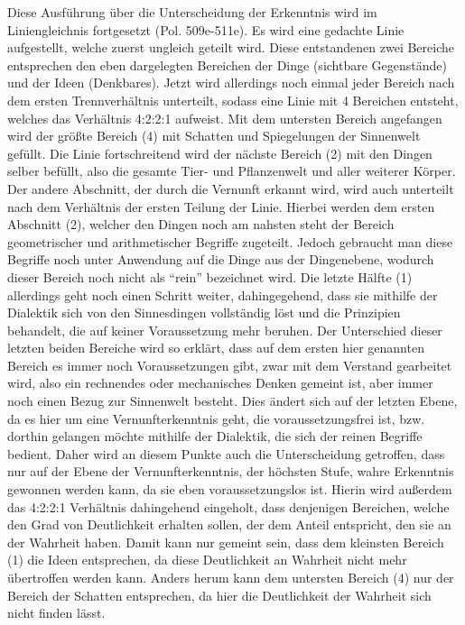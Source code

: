 Diese Ausführung über die Unterscheidung der Erkenntnis wird im Liniengleichnis fortgesetzt (Pol. 509e-511e).
Es wird eine gedachte Linie aufgestellt, welche zuerst ungleich geteilt wird. Diese entstandenen zwei Bereiche entsprechen den eben dargelegten Bereichen der Dinge (sichtbare Gegenstände) und der Ideen (Denkbares). Jetzt wird allerdings noch einmal jeder Bereich nach dem ersten Trennverhältnis unterteilt, sodass eine Linie mit 4 Bereichen entsteht, welches das Verhältnis 4:2:2:1 aufweist. Mit dem untersten Bereich angefangen wird der größte Bereich (4) mit Schatten und Spiegelungen der Sinnenwelt gefüllt. Die Linie fortschreitend wird der nächste Bereich (2) mit den Dingen selber befüllt, also die gesamte Tier- und Pflanzenwelt und aller weiterer Körper. Der andere Abschnitt, der durch die Vernunft erkannt wird, wird auch unterteilt nach dem Verhältnis der ersten Teilung der Linie. Hierbei werden dem ersten Abschnitt (2), welcher den Dingen noch am nahsten steht der Bereich geometrischer und arithmetischer Begriffe zugeteilt. Jedoch gebraucht man diese Begriffe noch unter Anwendung auf die Dinge aus der Dingenebene, wodurch dieser Bereich noch nicht als \enquote{rein} bezeichnet wird. Die letzte Hälfte (1) allerdings geht noch einen Schritt weiter, dahingegehend, dass sie mithilfe der Dialektik sich von den Sinnesdingen vollständig löst und die Prinzipien behandelt, die auf keiner Voraussetzung mehr beruhen. Der Unterschied dieser letzten beiden Bereiche wird so erklärt, dass auf dem ersten hier genannten Bereich es immer noch Voraussetzungen gibt, zwar mit dem Verstand gearbeitet wird, also ein rechnendes oder mechanisches Denken gemeint ist, aber immer noch einen Bezug zur Sinnenwelt besteht. Dies ändert sich auf der letzten Ebene, da es hier um eine Vernunfterkenntnis geht, die voraussetzungsfrei ist, bzw. dorthin gelangen möchte mithilfe der Dialektik, die sich der reinen Begriffe bedient. 
Daher wird an diesem Punkte auch die Unterscheidung getroffen, dass nur auf der Ebene der Vernunfterkenntnis, der höchsten Stufe, wahre Erkenntnis gewonnen werden kann, da sie eben voraussetzungslos ist. Hierin wird außerdem das 4:2:2:1 Verhältnis dahingehend eingeholt, dass denjenigen Bereichen, welche den Grad von Deutlichkeit erhalten sollen, der dem Anteil entspricht, den sie an der Wahrheit haben. Damit kann nur gemeint sein, dass dem kleinsten Bereich (1) die Ideen entsprechen, da diese Deutlichkeit an Wahrheit nicht mehr übertroffen werden kann. Anders herum kann dem untersten Bereich (4) nur der Bereich der Schatten entsprechen, da hier die Deutlichkeit der Wahrheit sich nicht finden lässt.
